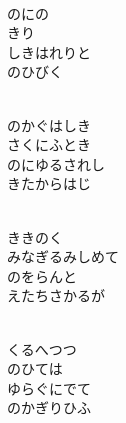 \documentclass[10pt,b5j]{tarticle} %
\begin{document}
\vspace{1.5em} %
\newcommand{\linespace}{0.5em} %
\newcommand{\blocksize}{0.5\hsize} %
\newcommand{\itemmargin}{6em} %
\begin{enumerate} %
    \setlength{\itemindent}{\itemmargin} %
    \begin{minipage}[c]{\blocksize}
    
        \vspace{\linespace}
        \item~\\
        のにの\\
        きり\\
        しきはれりと\\
        のひびく
        
        \vspace{\linespace}
        \item~\\
        のかぐはしき\\
        さくにふとき\\
        のにゆるされし\\
        きたからはじ
        
        \vspace{\linespace}
        \item~\\
        ききのく\\
        みなぎるみしめて\\
        のをらんと\\
        えたちさかるが
        
        \vspace{\linespace}
        \item~\\
        くるへつつ\\
        のひては\\
        ゆらぐにでて\\
        のかぎりひふ
        

\end{minipage}
\end{enumerate}
\end{document}
